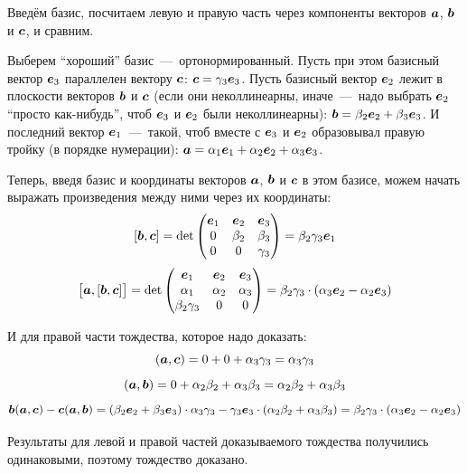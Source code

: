 \documentclass[a4paper,12pt]{article}
\begin{document}
  \begin{solution}
    Введём базис, посчитаем левую и правую часть через компоненты векторов $\boldsymbol a$, $\boldsymbol b$ и $\boldsymbol c$, и сравним.
    
    Выберем ``хороший'' базис~---~ортонормированный.
    Пусть при этом базисный вектор $\boldsymbol e_3$ параллелен вектору $\boldsymbol c$: $\bds c \hm= \gamma_3 \bds e_3$.
    Пусть базисный вектор $\boldsymbol e_2$ лежит в плоскости векторов $\boldsymbol b$ и $\boldsymbol c$ (если они неколлинеарны, иначе~---~надо выбрать $\boldsymbol e_2$ ``просто как-нибудь'', чтоб $\boldsymbol e_3$ и $\boldsymbol e_2$ были неколлинеарны): $\bds b \hm= \beta_2 \bds e_2 \hm+ \beta_3 \bds e_3$.
    И последний вектор $\boldsymbol e_1$~---~такой, чтоб вместе с $\boldsymbol e_3$ и $\boldsymbol e_2$ образовывал правую тройку (в порядке нумерации): $\bds a \hm= \alpha_1 \bds e_1 \hm+ \alpha_2 \bds e_2 \hm+ \alpha_3 \bds e_3$.
    
    Теперь, введя базис и координаты векторов $\boldsymbol a$, $\boldsymbol b$ и $\boldsymbol c$ в этом базисе, можем начать выражать произведения между ними через их координаты:
    \[
      [\boldsymbol b, \boldsymbol c] = \det \begin{pmatrix}
        \boldsymbol e_1 & \boldsymbol e_2 & \boldsymbol e_3\\
        0        & \beta_2  & \beta_3\\
        0        & 0        & \gamma_3
      \end{pmatrix}
      = \beta_2 \gamma_3 \boldsymbol e_1
    \]
    \[
      \bigl[\boldsymbol a, [\boldsymbol b, \boldsymbol c]\bigr] = \det \begin{pmatrix}
        \boldsymbol e_1         & \boldsymbol e_2 & \boldsymbol e_3\\
        \alpha_1         & \alpha_2 & \alpha_3\\
        \beta_2 \gamma_3 & 0        & 0
      \end{pmatrix}
      = \beta_2 \gamma_3 \cdot (\alpha_3 \boldsymbol e_2 - \alpha_2 \boldsymbol e_3)
    \]
    
    И для правой части тождества, которое надо доказать:
    \[
      (\boldsymbol a, \boldsymbol c) = 0 + 0 + \alpha_3 \gamma_3 = \alpha_3 \gamma_3
    \]
    \[
      (\boldsymbol a, \boldsymbol b) = 0 + \alpha_2 \beta_2 + \alpha_3 \beta_3 = \alpha_2 \beta_2 + \alpha_3 \beta_3
    \]
    \[
      \boldsymbol b (\boldsymbol a, \boldsymbol c) - \boldsymbol c (\boldsymbol a, \boldsymbol b)
        = (\beta_2 \boldsymbol e_2 + \beta_3 \boldsymbol e_3) \cdot \alpha_3 \gamma_3 - \gamma_3 \boldsymbol e_3 \cdot (\alpha_2 \beta_2 + \alpha_3 \beta_3)
        = \beta_2 \gamma_3 \cdot (\alpha_3 \boldsymbol e_2 - \alpha_2 \boldsymbol e_3)
    \]
    
    Результаты для левой и правой частей доказываемого тождества получились одинаковыми, поэтому тождество доказано.
  \end{solution}
  
\end{document}
